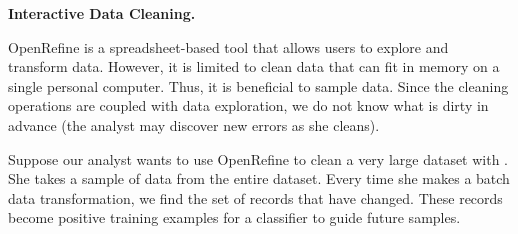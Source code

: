 \noindent\textbf{Interactive Data Cleaning.}
\begin{example}
OpenRefine is a spreadsheet-based tool that allows users to explore and transform data.
However, it is limited to clean data that can fit in memory on a single personal computer.
Thus, it is beneficial to sample data.
Since the cleaning operations are coupled with data exploration, we do not know what is dirty in advance (the analyst may discover new errors as she cleans).

Suppose our analyst wants to use OpenRefine to clean a very large dataset with \sys.
She takes a sample of data from the entire dataset.
Every time she makes a batch data transformation, we find the set of records that have changed.
These records become positive training examples for a classifier to guide future samples.
\end{example}